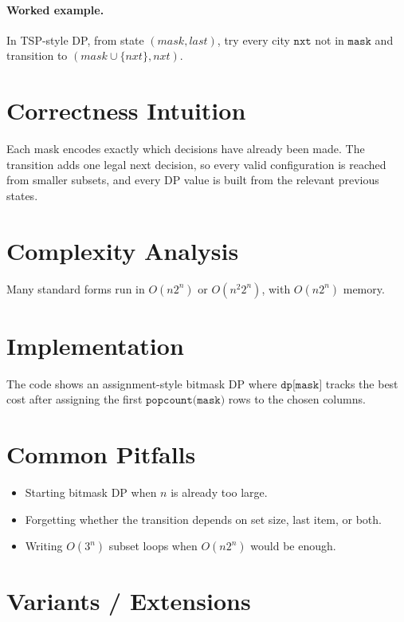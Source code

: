 \paragraph{Worked example.}
In TSP-style DP, from state \((mask, last)\), try every city \(\texttt{nxt}\) not in \(\texttt{mask}\) and transition
to \((mask \cup \{nxt\}, nxt)\).

\section*{Correctness Intuition}

Each mask encodes exactly which decisions have already been made. The transition adds one legal next decision, so every
valid configuration is reached from smaller subsets, and every DP value is built from the relevant previous states.

\section*{Complexity Analysis}

Many standard forms run in \(O(n 2^n)\) or \(O(n^2 2^n)\), with \(O(n 2^n)\) memory.

\section*{Implementation}

The code shows an assignment-style bitmask DP where \(\texttt{dp[mask]}\) tracks the best cost after assigning the
first \(\texttt{popcount(mask)}\) rows to the chosen columns.

\section*{Common Pitfalls}

\begin{itemize}
  \item Starting bitmask DP when \(n\) is already too large.
  \item Forgetting whether the transition depends on set size, last item, or both.
  \item Writing \(O(3^n)\) subset loops when \(O(n 2^n)\) would be enough.
\end{itemize}

\section*{Variants / Extensions}

